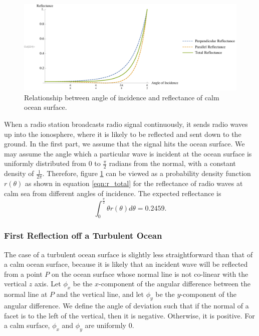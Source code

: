 \documentclass{article}
\begin{document}
\begin{figure}[htbp]
    \centering
    \includegraphics[scale=.55,clip,trim=40 0 6 10]{calm_surface_plot.pdf}
    \caption{Relationship between angle of incidence and reflectance of calm ocean surface.}
    \label{fig:calm_surface_plot}
\end{figure}

When a radio station broadcasts radio signal continuously, it sends radio waves up into the ionosphere, where it is likely to be reflected and sent down to the ground. In the first part, we assume that the signal hits the ocean surface. We may assume the angle which a particular wave is incident at the ocean surface is uniformly distributed from $0$ to $\frac{\pi}{2}$ radians from the normal, with a constant density of $\frac{1}{2\pi}.$ Therefore, figure \ref{fig:calm_surface_plot} can be viewed as a probability density function $r(\theta)$ as shown in equation \eqref{eqn:r_total} for the reflectance of radio waves at calm sea from different angles of incidence. The expected reflectance is \begin{equation}
    \int_0^\frac{\pi}{2} \theta r(\theta) d\theta = 0.2459.
\end{equation}

\subsubsection{First Reflection off a Turbulent Ocean}

The case of a turbulent ocean surface is slightly less straightforward than that of a calm ocean surface, because it is likely that an incident wave will be reflected from a point $P$ on the ocean surface whose normal line is not co-linear with the vertical $z$ axis. Let $\phi_x$ be the $x$-component of the angular difference between the normal line at $P$ and the vertical line, and let $\phi_y$ be the $y$-component of the angular difference. We define the angle of deviation such that if the normal of a facet is to the left of the vertical, then it is negative. Otherwise, it is positive. For a calm surface, $\phi_x$ and $\phi_y$ are uniformly 0.
\end{document}

